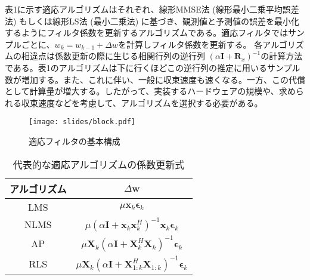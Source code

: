 \documentclass[a4paper, twocolumn]{ltjsarticle}
\begin{document}





  表1に示す適応アルゴリズムはそれぞれ、線形MMSE法 (線形最小二乗平均誤差法) もしくは線形LS法 (最小二乗法) に基づき、観測値と予測値の誤差を最小化するようにフィルタ係数を更新するアルゴリズムである。適応フィルタではサンプルごとに、\(w_k = w_{k-1} + \Delta w\)を計算しフィルタ係数を更新する。 各アルゴリズムの相違点は係数更新の際に生じる相関行列の逆行列 \( \left(\alpha \symbf{I} + \symbf{R}_x\right) ^ {-1} \)の計算方法である。表1のアルゴリズムは下に行くほどこの逆行列の推定に用いるサンプル数が増加する。また、これに伴い、一般に収束速度も速くなる。一方、この代償として計算量が増大する。したがって、実装するハードウェアの規模や、求められる収束速度などを考慮して、アルゴリズムを選択する必要がある。

  \begin{figure}[h]
    \centering
    \texttt{[image: slides/block.pdf]} \\
    \caption{適応フィルタの基本構成}
    \label{fig:block}
  \end{figure}

  \begin{table}[h]
    \centering
    \caption{代表的な適応アルゴリズムの係数更新式}
    \label{tab:formula}
    \begin{tabular}{|c|c|}
    \hline
    アルゴリズム  & \(\Delta \symbf{w}\)                                                                                             \\ \hline
    LMS         & \( \mu \symbf{x}_k \symbf{\epsilon}_k \)                                                                         \\ \hline
    NLMS        & \( \mu \left( \alpha \symbf{I} + \symbf{x}_k \symbf{x}_k^H \right)^{-1} \symbf{x}_k \symbf{\epsilon}_k \)        \\ \hline
    AP          & \(\mu \symbf{X}_k \left( \alpha \symbf{I} + \symbf{X}_k^H \symbf{X}_k \right)^{-1} \symbf{\epsilon}_k\)          \\ \hline
    RLS         & \( \mu \symbf{X}_k \left( \alpha \symbf{I} + \symbf{X}_{1:k}^H \symbf{X}_{1:k} \right)^{-1} \symbf{\epsilon}_k\) \\ \hline
    \end{tabular}
  \end{table}
\end{document}
